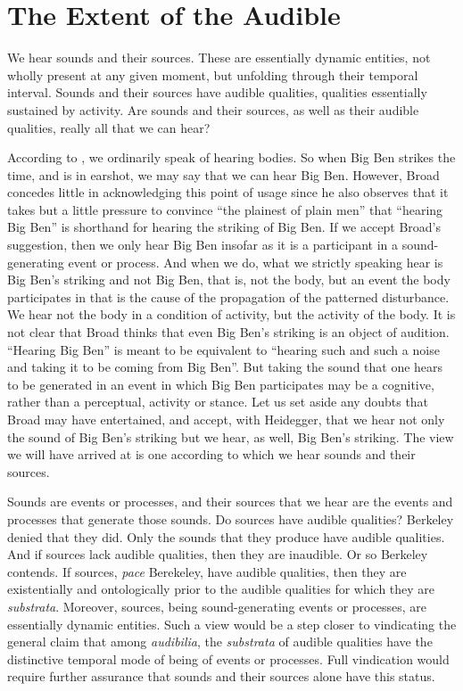 
\section{The Extent of the Audible} %
\label{sec:sounds_and_their_sources}

We hear sounds and their sources. These are essentially dynamic entities, not wholly present at any given moment, but unfolding through their temporal interval. Sounds and their sources have audible qualities, qualities essentially sustained by activity. Are sounds and their sources, as well as their audible qualities, really all that we can hear? 

According to \citet[4]{Broad:1952kx}, we ordinarily speak of hearing bodies. So when Big Ben strikes the time, and is in earshot, we may say that we can hear Big Ben. However, Broad concedes little in acknowledging this point of usage since he also observes that it takes but a little pressure to convince ``the plainest of plain men'' that ``hearing Big Ben'' is shorthand for hearing the striking of Big Ben. If we accept Broad's suggestion, then we only hear Big Ben insofar as it is a participant in a sound-generating event or process. And when we do, what we strictly speaking hear is Big Ben's striking and not Big Ben, that is, not the body, but an event the body participates in that is the cause of the propagation of the patterned disturbance. We hear not the body in a condition of activity, but the activity of the body. It is not clear that Broad thinks that even Big Ben's striking is an object of audition. ``Hearing Big Ben'' is meant to be equivalent to ``hearing such and such a noise and taking it to be coming from Big Ben''. But taking the sound that one hears to be generated in an event in which Big Ben participates may be a cognitive, rather than a perceptual, activity or stance. Let us set aside any doubts that Broad may have entertained, and accept, with Heidegger, that we hear not only the sound of Big Ben's striking but we hear, as well, Big Ben's striking. The view we will have arrived at is one according to which we hear sounds and their sources. 

Sounds are events or processes, and their sources that we hear are the events and processes that generate those sounds. Do sources have audible qualities? Berkeley denied that they did. Only the sounds that they produce have audible qualities. And if sources lack audible qualities, then they are inaudible. Or so Berkeley contends. If sources, \emph{pace} Berekeley, have audible qualities, then they are existentially and ontologically prior to the audible qualities for which they are \emph{substrata}. Moreover, sources, being sound-generating events or processes, are essentially dynamic entities. Such a view would be a step closer to vindicating the general claim that among \emph{audibilia}, the \emph{substrata} of audible qualities have the distinctive temporal mode of being of events or processes. Full vindication would require further assurance that sounds and their sources alone have this status.

